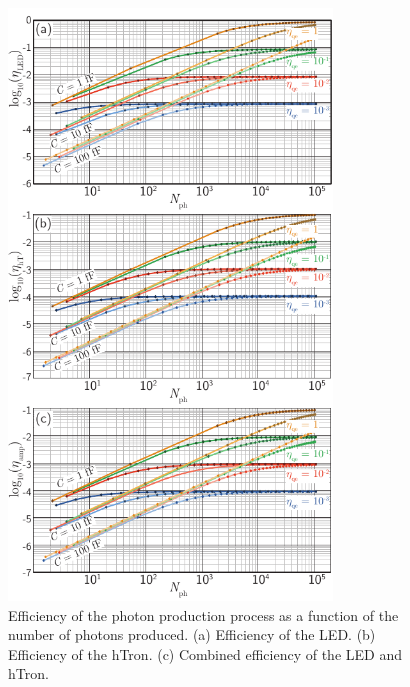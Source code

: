 \documentclass[twocolumn]{article}
\begin{document}
\begin{figure}[t!]
	\centerline{\includegraphics[width=8.6cm]{_transmitters_efficiency_small.pdf}}
	\caption{\label{fig:transmitters_efficiency}Efficiency of the photon production process as a function of the number of photons produced. (a) Efficiency of the LED. (b) Efficiency of the hTron. (c) Combined efficiency of the LED and hTron.}
\end{figure}
\end{document}
